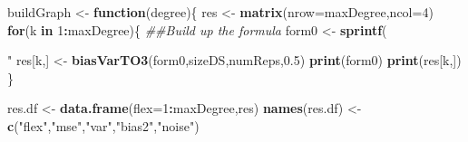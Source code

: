 \documentclass[]{article}
\newenvironment{Shaded}{\begin{snugshade}}{\end{snugshade}}
\newcommand{\CommentTok}[1]{\textcolor[rgb]{0.56,0.35,0.01}{\textit{#1}}}
\newcommand{\ControlFlowTok}[1]{\textcolor[rgb]{0.13,0.29,0.53}{\textbf{#1}}}
\newcommand{\DataTypeTok}[1]{\textcolor[rgb]{0.13,0.29,0.53}{#1}}
\newcommand{\DecValTok}[1]{\textcolor[rgb]{0.00,0.00,0.81}{#1}}
\newcommand{\FloatTok}[1]{\textcolor[rgb]{0.00,0.00,0.81}{#1}}
\newcommand{\KeywordTok}[1]{\textcolor[rgb]{0.13,0.29,0.53}{\textbf{#1}}}
\newcommand{\NormalTok}[1]{#1}
\newcommand{\OperatorTok}[1]{\textcolor[rgb]{0.81,0.36,0.00}{\textbf{#1}}}
\newcommand{\StringTok}[1]{\textcolor[rgb]{0.31,0.60,0.02}{#1}}
\begin{document}
\begin{Shaded}
\begin{Highlighting}[]
\NormalTok{buildGraph <-}\StringTok{ }\ControlFlowTok{function}\NormalTok{(degree)\{}
\NormalTok{  res <-}\StringTok{ }\KeywordTok{matrix}\NormalTok{(}\DataTypeTok{nrow=}\NormalTok{maxDegree,}\DataTypeTok{ncol=}\DecValTok{4}\NormalTok{)}
  \ControlFlowTok{for}\NormalTok{(k }\ControlFlowTok{in} \DecValTok{1}\OperatorTok{:}\NormalTok{maxDegree)\{}
    \CommentTok{##Build up the formula}
\NormalTok{    form0 <-}\StringTok{ }\KeywordTok{sprintf}\NormalTok{(}\StringTok{"%s + I(x^%s)"}\NormalTok{,form0,k)}
\NormalTok{    res[k,] <-}\StringTok{ }\KeywordTok{biasVarTO3}\NormalTok{(form0,sizeDS,numReps,}\FloatTok{0.5}\NormalTok{) }
    \KeywordTok{print}\NormalTok{(form0)}
    \KeywordTok{print}\NormalTok{(res[k,])}
\NormalTok{  \}}
  
\NormalTok{  res.df <-}\StringTok{ }\KeywordTok{data.frame}\NormalTok{(}\DataTypeTok{flex=}\DecValTok{1}\OperatorTok{:}\NormalTok{maxDegree,res)}
  \KeywordTok{names}\NormalTok{(res.df) <-}\StringTok{ }\KeywordTok{c}\NormalTok{(}\StringTok{"flex"}\NormalTok{,}\StringTok{"mse"}\NormalTok{,}\StringTok{"var"}\NormalTok{,}\StringTok{"bias2"}\NormalTok{,}\StringTok{"noise"}\NormalTok{)}
  
}
\end{Highlighting}
\end{Shaded}
\end{document}
